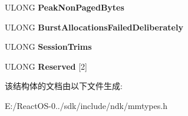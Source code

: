 \begin{DoxyCompactItemize}
U\+L\+O\+NG {\bfseries Peak\+Non\+Paged\+Bytes}
\item 
\mbox{\label{struct___m_m___d_r_i_v_e_r___v_e_r_i_f_i_e_r___d_a_t_a_a4454b8baf2b3878548bfc8c8651fe768}} 
U\+L\+O\+NG {\bfseries Burst\+Allocations\+Failed\+Deliberately}
\item 
\mbox{\label{struct___m_m___d_r_i_v_e_r___v_e_r_i_f_i_e_r___d_a_t_a_a8c4c0b5707118c2866f8484f661c61c3}} 
U\+L\+O\+NG {\bfseries Session\+Trims}
\item 
\mbox{\label{struct___m_m___d_r_i_v_e_r___v_e_r_i_f_i_e_r___d_a_t_a_a5cd094a614b8fa9a676d129903bc6b14}} 
U\+L\+O\+NG {\bfseries Reserved} \mbox{[}2\mbox{]}
\end{DoxyCompactItemize}


该结构体的文档由以下文件生成\+:\begin{DoxyCompactItemize}
\item 
E\+:/\+React\+O\+S-\/0../sdk/include/ndk/mmtypes.\+h\end{DoxyCompactItemize}
